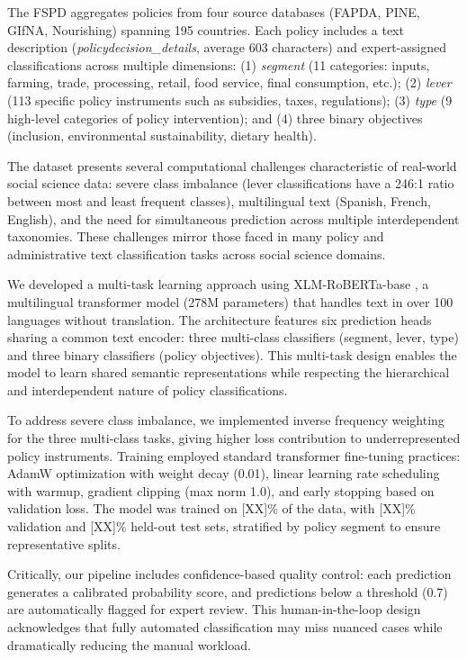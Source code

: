 \documentclass[a4paper,12pt]{article}
\begin{document}
The FSPD aggregates policies from four source databases (FAPDA, PINE, GIfNA, Nourishing) spanning 195 countries. Each policy includes a text description (\textit{policydecision\_details}, average 603 characters) and expert-assigned classifications across multiple dimensions: (1) \textit{segment} (11 categories: inputs, farming, trade, processing, retail, food service, final consumption, etc.); (2) \textit{lever} (113 specific policy instruments such as subsidies, taxes, regulations); (3) \textit{type} (9 high-level categories of policy intervention); and (4) three binary objectives (inclusion, environmental sustainability, dietary health).

The dataset presents several computational challenges characteristic of real-world social science data: severe class imbalance (lever classifications have a 246:1 ratio between most and least frequent classes), multilingual text (Spanish, French, English), and the need for simultaneous prediction across multiple interdependent taxonomies. These challenges mirror those faced in many policy and administrative text classification tasks across social science domains.

We developed a multi-task learning approach using XLM-RoBERTa-base \cite{conneau2020}, a multilingual transformer model (278M parameters) that handles text in over 100 languages without translation. The architecture features six prediction heads sharing a common text encoder: three multi-class classifiers (segment, lever, type) and three binary classifiers (policy objectives). This multi-task design enables the model to learn shared semantic representations while respecting the hierarchical and interdependent nature of policy classifications.

To address severe class imbalance, we implemented inverse frequency weighting for the three multi-class tasks, giving higher loss contribution to underrepresented policy instruments. Training employed standard transformer fine-tuning practices: AdamW optimization with weight decay (0.01), linear learning rate scheduling with warmup, gradient clipping (max norm 1.0), and early stopping based on validation loss. The model was trained on [XX]\% of the data, with [XX]\% validation and [XX]\% held-out test sets, stratified by policy segment to ensure representative splits.

Critically, our pipeline includes confidence-based quality control: each prediction generates a calibrated probability score, and predictions below a threshold (0.7) are automatically flagged for expert review. This human-in-the-loop design acknowledges that fully automated classification may miss nuanced cases while dramatically reducing the manual workload.
\end{document}
